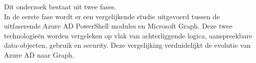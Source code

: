 \begin{comment}

Hier beschrijf je hoe je van plan bent het onderzoek te voeren. Welke onderzoekstechniek ga je toepassen om elk van je onderzoeksvragen te beantwoorden? Gebruik je hiervoor literatuurstudie, interviews met belanghebbenden (bv.~voor requirements-analyse), experimenten, simulaties, vergelijkende studie, risico-analyse, PoC, \ldots?

Valt je onderwerp onder één van de typische soorten bachelorproeven die besproken zijn in de lessen Research Methods (bv.\ vergelijkende studie of risico-analyse)? Zorg er dan ook voor dat we duidelijk de verschillende stappen terug vinden die we verwachten in dit soort onderzoek!

Vermijd onderzoekstechnieken die geen objectieve, meetbare resultaten kunnen opleveren. Enquêtes, bijvoorbeeld, zijn voor een bachelorproef informatica meestal \textbf{niet geschikt}. De antwoorden zijn eerder meningen dan feiten en in de praktijk blijkt het ook bijzonder moeilijk om voldoende respondenten te vinden. Studenten die een enquête willen voeren, hebben meestal ook geen goede definitie van de populatie, waardoor ook niet kan aangetoond worden dat eventuele resultaten representatief zijn.

Uit dit onderdeel moet duidelijk naar voor komen dat je bachelorproef ook technisch voldoen\-de diepgang zal bevatten. Het zou niet kloppen als een bachelorproef informatica ook door bv.\ een student marketing zou kunnen uitgevoerd worden.

Je beschrijft ook al welke tools (hardware, software, diensten, \ldots) je denkt hiervoor te gebruiken of te ontwikkelen.

Probeer ook een tijdschatting te maken. Hoe lang zal je met elke fase van je onderzoek bezig zijn en wat zijn de concrete \emph{deliverables} in elke fase?

\end{comment}

Dit onderzoek bestaat uit twee fases. \\
 
In de eerste fase wordt er een vergelijkende studie uitgevoerd tussen de uitfaserende Azure AD PowerShell modules en Microsoft Graph. Deze twee technologieën worden vergeleken op vlak van achterliggende logica, aanspreekbare data-objecten, gebruik en security. Deze vergelijking verduidelijkt de evolutie van Azure AD naar Graph. \\

